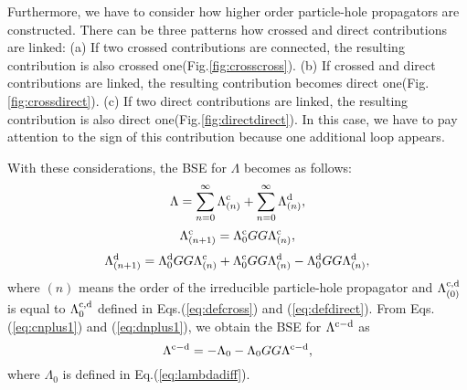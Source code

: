 %
Furthermore, we have to consider how higher order particle-hole propagators are constructed.
There can be three patterns how crossed and direct contributions are linked:
(a) If two crossed contributions are connected, the resulting contribution is also crossed one(Fig.\ref{fig:crosscross}).
(b) If crossed and direct contributions are linked, the resulting contribution becomes direct one(Fig.\ref{fig:crossdirect}).
(c) If two direct contributions are linked, the resulting contribution is also direct one(Fig.\ref{fig:directdirect}). 
In this case, we have to pay attention to the sign of this contribution because one additional loop appears.

With these considerations, the BSE for $\Lambda$ becomes as follows:
%
\begin{equation}
	\Lambda = \sum_{n=0}^{\infty}\Lambda^{\rm c}_{(n)} + \sum_{n=0}^{\infty}\Lambda^{\rm d}_{(n)},
	\label{eq:BSE}
\end{equation}
%
\begin{equation}
	\Lambda^{\rm c}_{(n+1)} = \Lambda^{\rm c}_0GG\Lambda^{\rm c}_{(n)},
	\label{eq:cnplus1}
\end{equation}
%
\begin{equation}
	\Lambda^{\rm d}_{(n+1)} = \Lambda^{\rm d}_0GG\Lambda^{\rm c}_{(n)}
	+ \Lambda^{\rm c}_0GG\Lambda^{\rm d}_{(n)}
	- \Lambda^{\rm d}_0GG\Lambda^{\rm d}_{(n)},
	\label{eq:dnplus1}
\end{equation}
%
where $(n)$ means the order of the irreducible particle-hole propagator
and $\Lambda^{\rm c, \rm d}_{(0)}$ is equal to $\Lambda^{\rm c, \rm d}_0$ defined in Eqs.(\ref{eq:defcross}) and (\ref{eq:defdirect}).
From Eqs.(\ref{eq:cnplus1}) and (\ref{eq:dnplus1}), we obtain the BSE for $\Lambda^{\rm c - \rm d}$ as
%
\begin{equation}
	\Lambda^{\rm c - \rm d}=  - \Lambda_0 - 
	\Lambda_0GG\Lambda^{\rm c - \rm d},
	\label{eq:BSELambda}
\end{equation}
%
where $\Lambda_0$ is defined in Eq.(\ref{eq:lambdadiff}).

